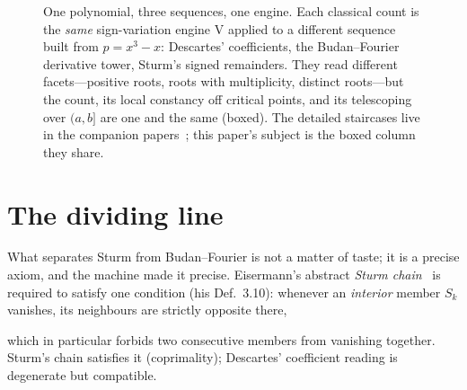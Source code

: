 \documentclass[11pt]{article}
\newcommand{\V}{\mathrm{V}}
\newcommand{\keyeq}[1]{\begin{center}\keybox{$\displaystyle #1$}\end{center}}
\begin{document}
\begin{figure}[htbp]
\centering
{}
\caption{One polynomial, three sequences, one engine. Each classical count is the \emph{same}
sign-variation engine $\V$ applied to a different sequence built from $p=x^3-x$: Descartes'
coefficients, the Budan--Fourier derivative tower, Sturm's signed remainders. They read different
facets---positive roots, roots with multiplicity, distinct roots---but the count, its local constancy
off critical points, and its telescoping over $(a,b]$ are one and the same (boxed). The detailed
staircases live in the companion papers~\cite{sturmlean,budanlean}; this paper's subject is the boxed
column they share.}
\label{fig:compare}
\end{figure}

\section{The dividing line}\label{sec:divide}

What separates Sturm from Budan--Fourier is not a matter of taste; it is a precise axiom, and the
machine made it precise. Eisermann's abstract \emph{Sturm chain}~\cite{eisermann} is required to satisfy
one condition (his Def.~3.10): whenever an \emph{interior} member $S_k$ vanishes, its neighbours are
strictly opposite there,
\keyeq{S_k(c)=0\ \Longrightarrow\ S_{k-1}(c)\,S_{k+1}(c)<0\qquad(0<k<n),}
which in particular forbids two consecutive members from vanishing together. Sturm's chain satisfies it
(coprimality); Descartes' coefficient reading is degenerate but compatible.
\end{document}
